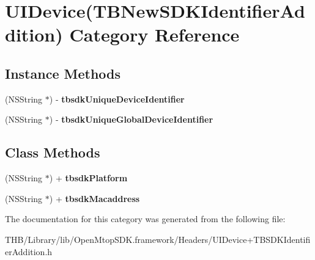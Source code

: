 \hypertarget{category_u_i_device_07_t_b_new_s_d_k_identifier_addition_08}{}\section{U\+I\+Device(T\+B\+New\+S\+D\+K\+Identifier\+Addition) Category Reference}
\label{category_u_i_device_07_t_b_new_s_d_k_identifier_addition_08}
\subsection*{Instance Methods}
\begin{DoxyCompactItemize}
\item 
\mbox{\label{category_u_i_device_07_t_b_new_s_d_k_identifier_addition_08_a16b64ccc7a32c65e0a086052ae4cbb70}} 
(N\+S\+String $\ast$) -\/ {\bfseries tbsdk\+Unique\+Device\+Identifier}
\item 
\mbox{\label{category_u_i_device_07_t_b_new_s_d_k_identifier_addition_08_a027ebdc87be9f6977a6ca6edb0985189}} 
(N\+S\+String $\ast$) -\/ {\bfseries tbsdk\+Unique\+Global\+Device\+Identifier}
\end{DoxyCompactItemize}
\subsection*{Class Methods}
\begin{DoxyCompactItemize}
\item 
\mbox{\label{category_u_i_device_07_t_b_new_s_d_k_identifier_addition_08_acedb8b9ea690d7992251812f8960383e}} 
(N\+S\+String $\ast$) + {\bfseries tbsdk\+Platform}
\item 
\mbox{\label{category_u_i_device_07_t_b_new_s_d_k_identifier_addition_08_a975454b9059afd20dc0444fa8f7c609a}} 
(N\+S\+String $\ast$) + {\bfseries tbsdk\+Macaddress}
\end{DoxyCompactItemize}


The documentation for this category was generated from the following file\+:\begin{DoxyCompactItemize}
\item 
T\+H\+B/\+Library/lib/\+Open\+Mtop\+S\+D\+K.\+framework/\+Headers/U\+I\+Device+\+T\+B\+S\+D\+K\+Identifier\+Addition.\+h\end{DoxyCompactItemize}
